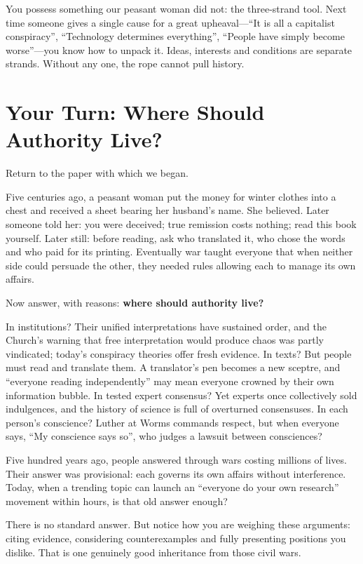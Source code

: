 You possess something our peasant woman did not: the three-strand tool. Next time someone gives a single cause for a great upheaval---``It is all a capitalist conspiracy'', ``Technology determines everything'', ``People have simply become worse''---you know how to unpack it. Ideas, interests and conditions are separate strands. Without any one, the rope cannot pull history.

\section[Your Turn: Where Should Authority Live?]{Your Turn: Where Should Authority Live?}
Return to the paper with which we began.

Five centuries ago, a peasant woman put the money for winter clothes into a chest and received a sheet bearing her husband's name. She believed. Later someone told her: you were deceived; true remission costs nothing; read this book yourself. Later still: before reading, ask who translated it, who chose the words and who paid for its printing. Eventually war taught everyone that when neither side could persuade the other, they needed rules allowing each to manage its own affairs.

Now answer, with reasons: \textbf{where should authority live?}

In institutions? Their unified interpretations have sustained order, and the Church's warning that free interpretation would produce chaos was partly vindicated; today's conspiracy theories offer fresh evidence. In texts? But people must read and translate them. A translator's pen becomes a new sceptre, and ``everyone reading independently'' may mean everyone crowned by their own information bubble. In tested expert consensus? Yet experts once collectively sold indulgences, and the history of science is full of overturned consensuses. In each person's conscience? Luther at Worms commands respect, but when everyone says, ``My conscience says so'', who judges a lawsuit between consciences?

Five hundred years ago, people answered through wars costing millions of lives. Their answer was provisional: each governs its own affairs without interference. Today, when a trending topic can launch an ``everyone do your own research'' movement within hours, is that old answer enough?

There is no standard answer. But notice how you are weighing these arguments: citing evidence, considering counterexamples and fully presenting positions you dislike. That is one genuinely good inheritance from those civil wars.
